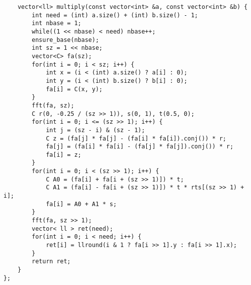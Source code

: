 \begin{verbatim}
    vector<ll> multiply(const vector<int> &a, const vector<int> &b) {
        int need = (int) a.size() + (int) b.size() - 1;
        int nbase = 1;
        while((1 << nbase) < need) nbase++;
        ensure_base(nbase);
        int sz = 1 << nbase;
        vector<C> fa(sz);
        for(int i = 0; i < sz; i++) {
            int x = (i < (int) a.size() ? a[i] : 0);
            int y = (i < (int) b.size() ? b[i] : 0);
            fa[i] = C(x, y);
        }
        fft(fa, sz);
        C r(0, -0.25 / (sz >> 1)), s(0, 1), t(0.5, 0);
        for(int i = 0; i <= (sz >> 1); i++) {
            int j = (sz - i) & (sz - 1);
            C z = (fa[j] * fa[j] - (fa[i] * fa[i]).conj()) * r;
            fa[j] = (fa[i] * fa[i] - (fa[j] * fa[j]).conj()) * r;
            fa[i] = z;
        }
        for(int i = 0; i < (sz >> 1); i++) {
            C A0 = (fa[i] + fa[i + (sz >> 1)]) * t;
            C A1 = (fa[i] - fa[i + (sz >> 1)]) * t * rts[(sz >> 1) + i];
            fa[i] = A0 + A1 * s;
        }
        fft(fa, sz >> 1);
        vector< ll > ret(need);
        for(int i = 0; i < need; i++) {
            ret[i] = llround(i & 1 ? fa[i >> 1].y : fa[i >> 1].x);
        }
        return ret;
    }
};
\end{verbatim}
\clearpage